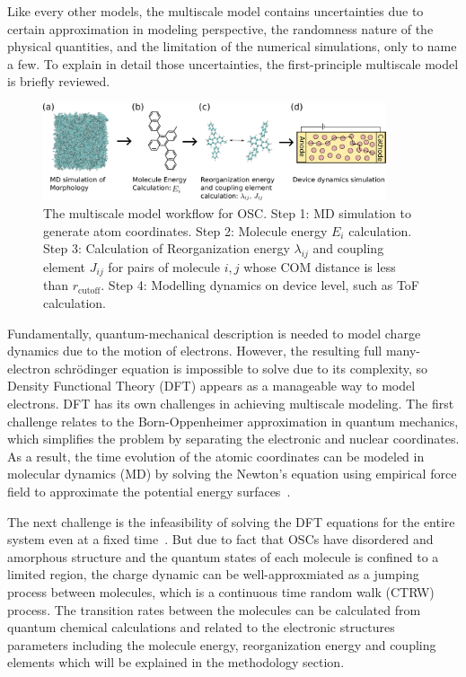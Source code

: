 \documentclass[%
 reprint,
 amsmath,amssymb,
 aps,
]{revtex4-2}
\begin{document}
Like every other models, the multiscale model contains uncertainties due to certain approximation in modeling perspective, the randomness nature of the physical quantities, and the limitation of the numerical simulations, only to name a few.
To explain in detail those uncertainties, the first-principle multiscale model is briefly reviewed. 

\begin{figure}
  \centering
  \includegraphics[width=0.9\textwidth]{figs/MSM.pdf}
  \caption{The multiscale model workflow for OSC. Step 1: MD simulation to generate atom coordinates. Step 2: Molecule energy $E_i$ calculation. Step 3: Calculation of Reorganization energy $\lambda_{ij}$ and coupling element $J_{ij}$ for pairs of molecule $i,j$ whose COM distance is less than $r_\text{cutoff}$. Step 4: Modelling dynamics on device level, such as ToF calculation.}
  \label{fig:MSM}
\end{figure}

Fundamentally, quantum-mechanical description is needed to model charge dynamics due to the motion of electrons. However, the resulting full many-electron schr\"{o}dinger equation is impossible to solve due to its complexity, so Density Functional Theory (DFT) \cite{kohn_selfconsistent_1965,jones_density_2015, hammesschiffer_conundrum_2017} appears as a manageable way to model electrons.
DFT has its own challenges in achieving multiscale modeling.
The first challenge relates to the Born-Oppenheimer approximation \cite{born_zur_1927} in quantum
mechanics, which simplifies the problem by separating the electronic and nuclear
coordinates. As a result, the time evolution of the atomic coordinates can be modeled in molecular dynamics (MD) by solving the Newton's equation using empirical force field to approximate the potential energy surfaces~\cite{rapaport_art_2004}. 

The next challenge is the infeasibility of solving the DFT equations for the entire system even at a fixed time~\cite{hammesschiffer_conundrum_2017}. 
But due to fact that OSCs have disordered and amorphous structure and the quantum states of each molecule is confined to a limited region, the charge dynamic can be well-approxmiated as a jumping process between molecules, which is a continuous time random walk (CTRW) process.
The transition rates between the molecules can be calculated from quantum chemical calculations and related to the electronic structures parameters including the molecule energy, reorganization energy and coupling elements which will be explained in the methodology section. 
\end{document}
